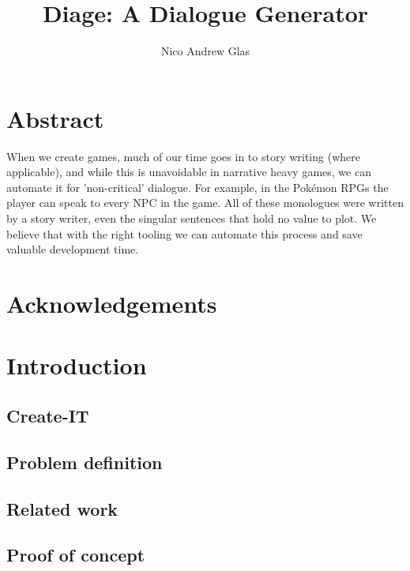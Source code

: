 \documentclass[11pt,a4paper,onecolumn,titlepage]{article}
\author{Nico Andrew Glas}
\title{Diage: A Dialogue Generator}
\begin{document}
\maketitle
\section*{Abstract}
When we create games, much of our time goes in to story writing (where applicable), and while this is unavoidable in narrative heavy games, we can automate it for 'non-critical' dialogue. For example, in the Pokémon RPGs the player can speak to every NPC in the game. All of these monologues were written by a story writer, even the singular sentences that hold no value to plot. We believe that with the right tooling we can automate this process and save valuable development time. \cite{Cavazza:2002:CIS:630325.630747} \cite{Greimas:Boydstun:90} \cite{Magerko:2004:ACD:1597321.1597339} \cite{Porteous:2009:CNG:1695522.1695557} \cite{Weyhrauch:1997:GID:925491} \cite{Riedl03character-focusednarrative} \cite{Riedl:2003:MIU:860575.860694} \cite{Riedl:2004:IPM:1018409.1018753} \cite{Sgouros199929}

\section*{Acknowledgements}

\newpage
\tableofcontents
\newpage
\section{Introduction}

\subsection{Create-IT}

\subsection{Problem definition}

\subsection{Related work}

\subsection{Proof of concept}
\newpage
\end{document}
